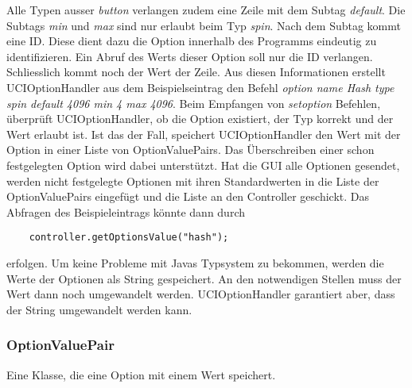 Alle Typen ausser \textit{button} verlangen zudem eine Zeile mit dem Subtag \textit{default}.
Die Subtags \textit{min} und \textit{max} sind nur erlaubt beim Typ \textit{spin}.
\newline
Nach dem Subtag kommt eine ID\@.
Diese dient dazu die Option innerhalb des Programms eindeutig zu identifizieren.
Ein Abruf des Werts dieser Option soll nur die ID verlangen.
\newline
Schliesslich kommt noch der Wert der Zeile.
\newline
Aus diesen Informationen erstellt UCIOptionHandler aus dem Beispielseintrag den Befehl
\textit{option name Hash type spin default 4096 min 4 max 4096}.
\newline\newline
Beim Empfangen von \textit{setoption} Befehlen, \"uberpr\"uft UCIOptionHandler, ob die Option existiert,
der Typ korrekt und der Wert erlaubt ist.
Ist das der Fall, speichert UCIOptionHandler den Wert mit der Option in einer Liste von OptionValuePairs.
Das \"Uberschreiben einer schon festgelegten Option wird dabei unterst\"utzt.
Hat die GUI alle Optionen gesendet, werden nicht festgelegte Optionen mit ihren Standardwerten in die Liste
der OptionValuePairs eingef\"ugt und die Liste an den Controller geschickt.
\newline
Das Abfragen des Beispieleintrags k\"onnte dann durch
\begin{lstlisting}
    controller.getOptionsValue("hash");
\end{lstlisting}
erfolgen.
Um keine Probleme mit Javas Typsystem zu bekommen, werden die Werte der Optionen als String gespeichert.
An den notwendigen Stellen muss der Wert dann noch umgewandelt werden.
UCIOptionHandler garantiert aber, dass der String umgewandelt werden kann.
\subsubsection{OptionValuePair}\label{subsubsec:optionvaluepair}
Eine Klasse, die eine Option mit einem Wert speichert.
\pagebreak